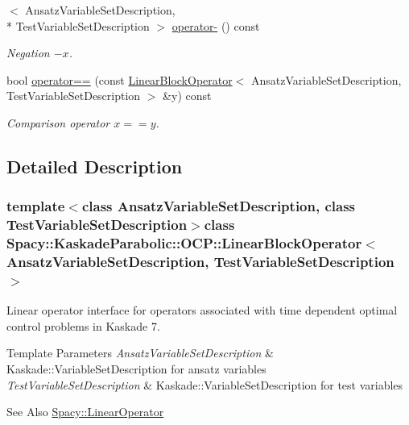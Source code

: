 \begin{DoxyCompactItemize}
$<$ Ansatz\-Variable\-Set\-Description, \\*
Test\-Variable\-Set\-Description $>$ \hyperlink{classSpacy_1_1AddArithmeticOperators_a5acd030bf265d130983fd6e3c5b68be5}{operator-\/} () const
\begin{DoxyCompactList}\small\item\em Negation $ -x$. \end{DoxyCompactList}\item 
bool \hyperlink{classSpacy_1_1AddArithmeticOperators_a5ff1909f49f4a705d69663dc2d4b6316}{operator==} (const \hyperlink{classSpacy_1_1KaskadeParabolic_1_1OCP_1_1LinearBlockOperator}{Linear\-Block\-Operator}$<$ Ansatz\-Variable\-Set\-Description, Test\-Variable\-Set\-Description $>$ \&y) const
\begin{DoxyCompactList}\small\item\em Comparison operator $ x==y$. \end{DoxyCompactList}\end{DoxyCompactItemize}


\subsection{Detailed Description}
\subsubsection*{template$<$class Ansatz\-Variable\-Set\-Description, class Test\-Variable\-Set\-Description$>$class Spacy\-::\-Kaskade\-Parabolic\-::\-O\-C\-P\-::\-Linear\-Block\-Operator$<$ Ansatz\-Variable\-Set\-Description, Test\-Variable\-Set\-Description $>$}

Linear operator interface for operators associated with time dependent optimal control problems in Kaskade 7. 


\begin{DoxyTemplParams}{Template Parameters}
{\em Ansatz\-Variable\-Set\-Description} & Kaskade\-::\-Variable\-Set\-Description for ansatz variables \\
\hline
{\em Test\-Variable\-Set\-Description} & Kaskade\-::\-Variable\-Set\-Description for test variables \\
\hline
\end{DoxyTemplParams}
\begin{DoxySeeAlso}{See Also}
\hyperlink{classSpacy_1_1LinearOperator}{Spacy\-::\-Linear\-Operator} 
\end{DoxySeeAlso}


